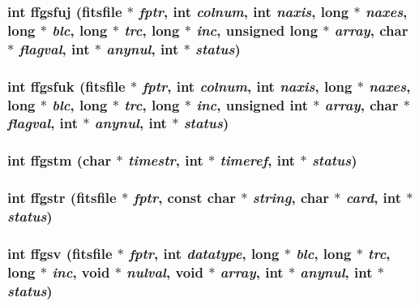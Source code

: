 \subsubsection{\setlength{\rightskip}{0pt plus 5cm}int ffgsfuj (\bf{fitsfile} $\ast$ {\em fptr}, int {\em colnum}, int {\em naxis}, long $\ast$ {\em naxes}, long $\ast$ {\em blc}, long $\ast$ {\em trc}, long $\ast$ {\em inc}, unsigned long $\ast$ {\em array}, char $\ast$ {\em flagval}, int $\ast$ {\em anynul}, int $\ast$ {\em status})}\label{fitsio__64_8h_60eb38f1f62e5060ffca964466dd248e}


\subsubsection{\setlength{\rightskip}{0pt plus 5cm}int ffgsfuk (\bf{fitsfile} $\ast$ {\em fptr}, int {\em colnum}, int {\em naxis}, long $\ast$ {\em naxes}, long $\ast$ {\em blc}, long $\ast$ {\em trc}, long $\ast$ {\em inc}, unsigned int $\ast$ {\em array}, char $\ast$ {\em flagval}, int $\ast$ {\em anynul}, int $\ast$ {\em status})}\label{fitsio__64_8h_8c55ce0c3ac249a3b00043f7872099f4}


\subsubsection{\setlength{\rightskip}{0pt plus 5cm}int ffgstm (char $\ast$ {\em timestr}, int $\ast$ {\em timeref}, int $\ast$ {\em status})}\label{fitsio__64_8h_261640d215b78ccc9368b45915b4b199}


\subsubsection{\setlength{\rightskip}{0pt plus 5cm}int ffgstr (\bf{fitsfile} $\ast$ {\em fptr}, const char $\ast$ {\em string}, char $\ast$ {\em card}, int $\ast$ {\em status})}\label{fitsio__64_8h_b229520d7664424605646082f173a667}


\subsubsection{\setlength{\rightskip}{0pt plus 5cm}int ffgsv (\bf{fitsfile} $\ast$ {\em fptr}, int {\em datatype}, long $\ast$ {\em blc}, long $\ast$ {\em trc}, long $\ast$ {\em inc}, void $\ast$ {\em nulval}, void $\ast$ {\em array}, int $\ast$ {\em anynul}, int $\ast$ {\em status})}\label{fitsio__64_8h_caeaf7b359e9abbf70e7e912e14329fa}


